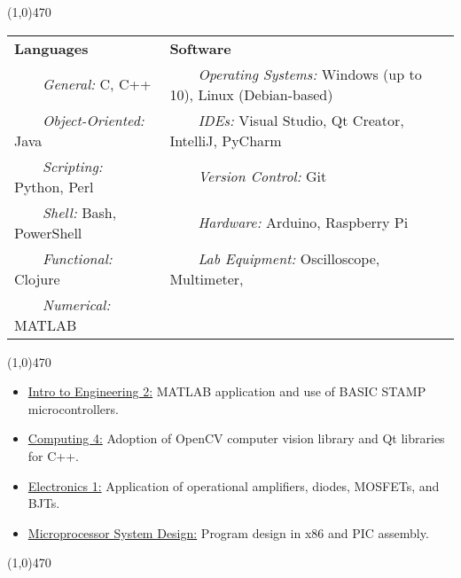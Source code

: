 \documentclass[11pt, a4paper]{article} %
\newcommand{\tabitem}{~~\llap{\textbullet}~~}
\begin{document}
\noindent \line(1,0){470}\\

 \smallskip
\vspace{-10pt}
\begin{center}
\begin{tabular}{l|l}
	{\bf Languages} & {\bf Software} \\
	\tabitem \textit{General:} C, C++ & \tabitem \textit{Operating Systems:} Windows (up to 10), Linux (Debian-based)\\
	\tabitem \textit{Object-Oriented:} Java & \tabitem \textit{IDEs:} Visual Studio, Qt Creator, IntelliJ, PyCharm\\
	\tabitem \textit{Scripting:} Python, Perl & \tabitem \textit{Version Control:} Git\\
	\tabitem \textit{Shell:} Bash, PowerShell & \tabitem \textit{Hardware:} Arduino, Raspberry Pi\\
	\tabitem \textit{Functional:} Clojure & \tabitem \textit{Lab Equipment:} Oscilloscope, Multimeter,\\
	\tabitem \textit{Numerical:} MATLAB & ~\\
\end{tabular}
\end{center}

\noindent \line(1,0){470}\\

\begin{itemize}
\itemsep0em
	\item \underline{Intro to Engineering 2:} MATLAB application and use of BASIC STAMP microcontrollers.	
	\item \underline{Computing 4:} Adoption of OpenCV computer vision library and Qt libraries for C++.
	\item \underline{Electronics 1:} Application of operational amplifiers, diodes, MOSFETs, and BJTs.
	\item \underline{Microprocessor System Design:} Program design in x86 and PIC assembly.
\end{itemize}

\noindent \line(1,0){470} \\
\end{document}

